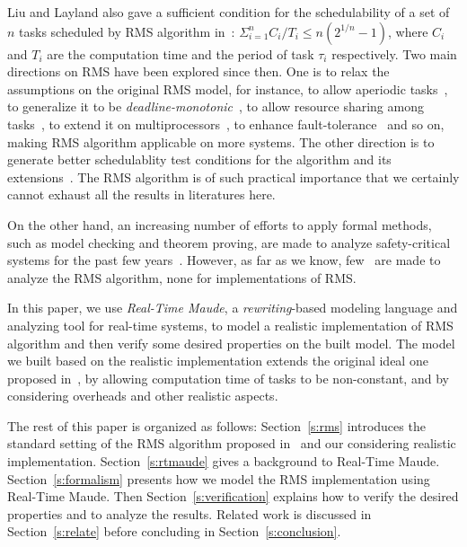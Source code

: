 \documentclass{llncs}
\begin{document}
Liu and Layland also gave a sufficient condition for the
schedulability of a set of $n$ tasks scheduled by RMS algorithm
in~\cite{DBLP:journals/jacm/LiuL73}:
$\displaystyle\Sigma^n_{i=1}C_i/T_i \le n(2^{1/n}-1)$, where $C_i$ and
$T_i$ are the computation time and the period of task $\tau_i$
respectively. Two main directions on RMS have been explored since
then. One is to relax the assumptions on the original RMS model, for
instance, to allow aperiodic
tasks~\cite{DBLP:conf/rtss/LehoczkySS87,DBLP:journals/rts/SpruntSL89,DBLP:conf/rtss/LehoczkyR92,DBLP:journals/tc/StrosniderLS95},
to generalize it to be
\emph{deadline-monotonic}~\cite{DBLP:journals/pe/LeungW82,audsley1993deadline},
to allow resource sharing among tasks~\cite{DBLP:journals/tc/ShaRL90},
to extend it on
multiprocessors~\cite{dhall1978real,DBLP:journals/rts/LopezGDG03,DBLP:journals/tpds/LopezDG04,DBLP:journals/tc/BaruahG03},
to enhance
fault-tolerance~\cite{DBLP:journals/rts/OhS94,DBLP:journals/rts/GhoshMMS98,DBLP:journals/tpds/BertossiMR99}
and so on, making RMS algorithm applicable on more systems. The other
direction is to generate better schedulablity test conditions for the
algorithm and its
extensions~\cite{DBLP:conf/rtss/LehoczkySD89,DBLP:conf/rtss/KuoM91,DBLP:journals/tc/BiniBB03,DBLP:journals/rts/LopezGDG03,DBLP:journals/tc/BaruahG03,gardner1999}. The
RMS algorithm is of such practical importance that we certainly cannot
exhaust all the results in literatures here.

On the other hand, an increasing number of efforts to apply formal
methods, such as model checking and theorem proving, are made to
analyze safety-critical systems for the past few
years~\cite{DBLP:journals/iandc/MeseguerR13,DBLP:journals/cacm/Leroy09,DBLP:conf/sosp/KleinEHACDEEKNSTW09}. However,
as far as we know, few~\cite{DBLP:conf/iceccs/CuiDT14,TianD2011} are
made to analyze the RMS algorithm, none for implementations of RMS.

In this paper, we use \emph{Real-Time Maude}, a \emph{rewriting}-based
modeling language and analyzing tool for real-time systems, to model a
realistic implementation of RMS algorithm and then verify some desired
properties on the built model. The model we built based on the
realistic implementation extends the original ideal one proposed
in~\cite{DBLP:journals/jacm/LiuL73}, by allowing computation time of
tasks to be non-constant, and by considering overheads and other
realistic aspects.

The rest of this paper is organized as follows: Section~\ref{s:rms}
introduces the standard setting of the RMS algorithm proposed
in~\cite{DBLP:journals/jacm/LiuL73} and our considering realistic
implementation. Section~\ref{s:rtmaude} gives a background to
Real-Time Maude. Section~\ref{s:formalism} presents how we model the
RMS implementation using Real-Time Maude. Then
Section~\ref{s:verification} explains how to verify the desired
properties and to analyze the results. Related work is discussed in
Section~\ref{s:relate} before concluding in
Section~\ref{s:conclusion}.
\end{document}
